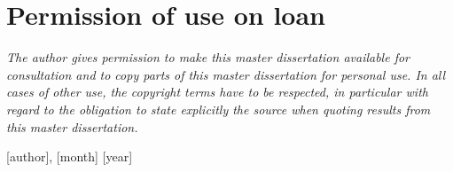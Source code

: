 
\titleformat{\chapter}{}{}{0em}{\bf\Huge}
\chapter*{Permission of use on loan}

\vspace{6cm}


\textit{The author gives permission to make this master dissertation available for consultation and to copy parts of this master dissertation for personal use. In all cases of other use, the copyright terms have to be respected, in particular with regard to the obligation to state explicitly the source when quoting results from this master dissertation.}

\vspace{2cm}

[author], [month] [year]